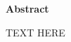 \begin{center}
\Large
\textbf{Abstract}
\end{center}

\normalsize

TEXT HERE

\thispagestyle{empty}

\normalsize

\newpage